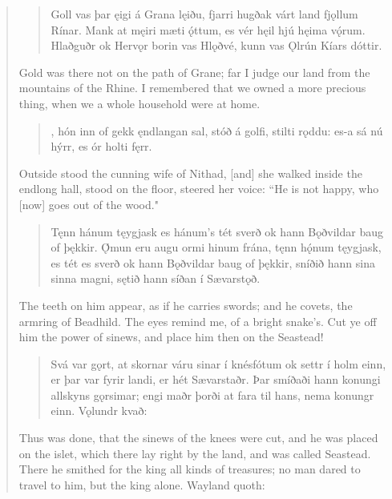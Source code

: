 \begin{verse}
\begin{verse}
\bva Goll vas þar ęigi \hld á Grana lęiðu,
fjarri hugðak várt land \hld fjǫllum Rínar.
Mank at męiri \hld mæti ǫ́ttum,
es vér hęil hjú \hld hęima vǫ́rum. \\%
Hlaðguðr ok Hervǫr \hld borin vas Hlǫðvé,
kunn vas Ǫlrún \hld Kíars dóttir.  \\%
\end{verse}

\bvb Gold was there not on the path of Grane; far I judge our land from the mountains of the Rhine. I remembered that we owned a more precious thing, when we a whole household were at home.

\begin{verse}
,
hón inn of gekk \hld ęndlangan sal,
stóð á golfi, \hld stilti rǫddu:
es-a sá nú hýrr, \hld es ór holti fęrr. \\%
\end{verse}

\bvb Outside stood the cunning wife of Nithad, [and] she walked inside the endlong hall, stood on the floor, steered her voice: “He is not happy, who [now] goes out of the wood."

\begin{verse}
\bva Tęnn hánum tęygjask \hld es hánum's tét sverð
ok hann Bǫðvildar \hld baug of þękkir.
Ǫ́mun eru augu \hld ormi hinum frána,
tęnn hǫ́num tęygjask, \hld es tét es sverð
ok hann Bǫðvildar \hld baug of þękkir,
sníðið hann sina \hld sinna magni,
sętið hann síðan \hld í Sævarstǫð. \\%
\end{verse}

\bvb The teeth on him appear, as if he carries swords; and he covets, the armring of Beadhild. The eyes remind me, of a bright snake's. Cut ye off him the power of sinews, and place him then on the Seastead!

\begin{verse}
\bva Svá var gǫrt, at skornar váru sinar í knésfótum ok settr í holm einn, er þar var fyrir landi, er hét Sævarstaðr. Þar smíðaði hann konungi allskyns gǫrsimar; engi maðr þorði at fara til hans, nema konungr einn. Vǫlundr kvað: \\%
\end{verse}

\bvb Thus was done, that the sinews of the knees were cut, and he was placed on the islet, which there lay right by the land, and was called Seastead. There he smithed for the king all kinds of treasures; no man dared to travel to him, but the king alone. Wayland quoth: \\


\end{verse}
